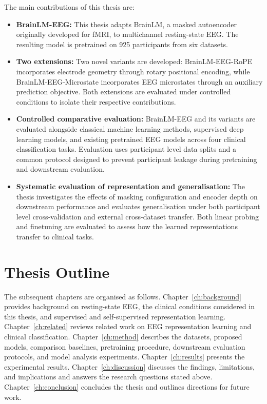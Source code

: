The main contributions of this thesis are:

\begin{itemize}

    \item \textbf{BrainLM-EEG:} This thesis adapts BrainLM, a masked autoencoder originally developed for fMRI, to multichannel resting-state EEG. The resulting model is pretrained on 925 participants from six datasets.

    \item \textbf{Two extensions:} Two novel variants are developed: BrainLM-EEG-RoPE incorporates electrode geometry through rotary positional encoding, while BrainLM-EEG-Microstate incorporates EEG microstates through an auxiliary prediction objective. Both extensions are evaluated under controlled conditions to isolate their respective contributions.

    \item \textbf{Controlled comparative evaluation:} BrainLM-EEG and its variants are evaluated alongside classical machine learning methods, supervised deep learning models, and existing pretrained EEG models across four clinical classification tasks. Evaluation uses participant level data splits and a common protocol designed to prevent participant leakage during pretraining and downstream evaluation.

    \item \textbf{Systematic evaluation of representation and generalisation:} The thesis investigates the effects of masking configuration and encoder depth on downstream performance and evaluates generalisation under both participant level cross-validation and external cross-dataset transfer. Both linear probing and finetuning are evaluated to assess how the learned representations transfer to clinical tasks.

\end{itemize}


\section{Thesis Outline}\label{sec:intro_outline}

The subsequent chapters are organised as follows. Chapter~\ref{ch:background} provides background on resting-state EEG, the clinical conditions considered in this thesis, and supervised and self-supervised representation learning. Chapter~\ref{ch:related} reviews related work on EEG representation learning and clinical classification. Chapter~\ref{ch:method} describes the datasets, proposed models, comparison baselines, pretraining procedure, downstream evaluation protocols, and model analysis experiments. Chapter~\ref{ch:results} presents the experimental results. Chapter~\ref{ch:discussion} discusses the findings, limitations, and implications and answers the research questions stated above. Chapter~\ref{ch:conclusion} concludes the thesis and outlines directions for future work.
